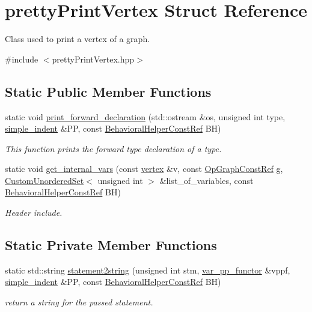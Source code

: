 \hypertarget{structprettyPrintVertex}{}\section{pretty\+Print\+Vertex Struct Reference}
\label{structprettyPrintVertex}


Class used to print a vertex of a graph.  




{\ttfamily \#include $<$pretty\+Print\+Vertex.\+hpp$>$}

\subsection*{Static Public Member Functions}
\begin{DoxyCompactItemize}
\item 
static void \hyperlink{structprettyPrintVertex_a4cb8e4223c13af526a915070207d5c6b}{print\+\_\+forward\+\_\+declaration} (std\+::ostream \&os, unsigned int type, \hyperlink{classsimple__indent}{simple\+\_\+indent} \&PP, const \hyperlink{behavioral__helper_8hpp_aae973b54cac87eef3b27442aa3e1e425}{Behavioral\+Helper\+Const\+Ref} BH)
\begin{DoxyCompactList}\small\item\em This function prints the forward type declaration of a type. \end{DoxyCompactList}\item 
static void \hyperlink{structprettyPrintVertex_a0b7c685362aca7a4cd5f0944c5f9e326}{get\+\_\+internal\+\_\+vars} (const \hyperlink{graph_8hpp_abefdcf0544e601805af44eca032cca14}{vertex} \&v, const \hyperlink{op__graph_8hpp_a9a0b240622c47584bee6951a6f5de746}{Op\+Graph\+Const\+Ref} g, \hyperlink{classCustomUnorderedSet}{Custom\+Unordered\+Set}$<$ unsigned int $>$ \&list\+\_\+of\+\_\+variables, const \hyperlink{behavioral__helper_8hpp_aae973b54cac87eef3b27442aa3e1e425}{Behavioral\+Helper\+Const\+Ref} BH)
\begin{DoxyCompactList}\small\item\em Header include. \end{DoxyCompactList}\end{DoxyCompactItemize}
\subsection*{Static Private Member Functions}
\begin{DoxyCompactItemize}
\item 
static std\+::string \hyperlink{structprettyPrintVertex_aa3c36959163624dbfbf71316a5ac9512}{statement2string} (unsigned int stm, \hyperlink{structvar__pp__functor}{var\+\_\+pp\+\_\+functor} \&vppf, \hyperlink{classsimple__indent}{simple\+\_\+indent} \&PP, const \hyperlink{behavioral__helper_8hpp_aae973b54cac87eef3b27442aa3e1e425}{Behavioral\+Helper\+Const\+Ref} BH)
\begin{DoxyCompactList}\small\item\em return a string for the passed statement. \end{DoxyCompactList}\end{DoxyCompactItemize}


